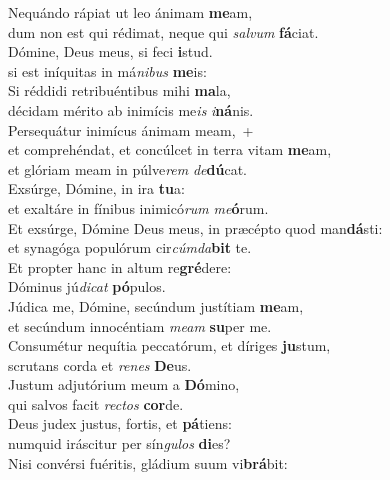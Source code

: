 \evenverse Nequándo rápiat ut leo ánimam \textbf{me}am,~\*\\
\evenverse dum non est qui rédimat, neque qui \textit{sal}\textit{vum} \textbf{fá}ciat.\\
\oddverse Dómine, Deus meus, si feci \textbf{i}stud.~\*\\
\oddverse si est iníquitas in má\textit{ni}\textit{bus} \textbf{me}is:\\
\evenverse Si réddidi retribuéntibus mihi \textbf{ma}la,~\*\\
\evenverse décidam mérito ab inimícis me\textit{is} \textit{i}\textbf{ná}nis.\\
\oddverse Persequátur inimícus ánimam meam,~+\\
\oddverse  et comprehéndat, et concúlcet in terra vitam \textbf{me}am,~\*\\
\oddverse et glóriam meam in púlve\textit{rem} \textit{de}\textbf{dú}cat.\\
\evenverse Exsúrge, Dómine, in ira \textbf{tu}a:~\*\\
\evenverse et exaltáre in fínibus inimicó\textit{rum} \textit{me}\textbf{ó}rum.\\
\oddverse Et exsúrge, Dómine Deus meus, in præcépto quod man\textbf{dá}sti:~\*\\
\oddverse et synagóga populórum cir\textit{cúm}\textit{da}\textbf{bit} te.\\
\evenverse Et propter hanc in altum re\textbf{gré}dere:~\*\\
\evenverse Dóminus jú\textit{di}\textit{cat} \textbf{pó}pulos.\\
\oddverse Júdica me, Dómine, secúndum justítiam \textbf{me}am,~\*\\
\oddverse et secúndum innocéntiam \textit{me}\textit{am} \textbf{su}per me.\\
\evenverse Consumétur nequítia peccatórum, et díriges \textbf{ju}stum,~\*\\
\evenverse scrutans corda et \textit{re}\textit{nes} \textbf{De}us.\\
\oddverse Justum adjutórium meum a \textbf{Dó}mino,~\*\\
\oddverse qui salvos facit \textit{re}\textit{ctos} \textbf{cor}de.\\
\evenverse Deus judex justus, fortis, et \textbf{pá}tiens:~\*\\
\evenverse numquid iráscitur per sín\textit{gu}\textit{los} \textbf{di}es?\\
\oddverse Nisi convérsi fuéritis, gládium suum vi\textbf{brá}bit:~\*\\
